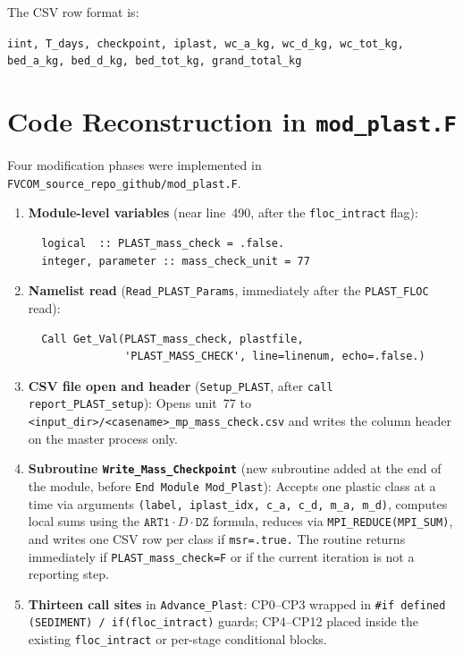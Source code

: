 \documentclass[11pt]{article}
\begin{document}
The CSV row format is:
\begin{center}
\texttt{iint, T\_days, checkpoint, iplast, wc\_a\_kg, wc\_d\_kg, wc\_tot\_kg, bed\_a\_kg, bed\_d\_kg, bed\_tot\_kg, grand\_total\_kg}
\end{center}

\section*{Code Reconstruction in \texttt{mod\_plast.F}}

Four modification phases were implemented in
\texttt{FVCOM\_source\_repo\_github/mod\_plast.F}.

\begin{enumerate}

\item \textbf{Module-level variables} (near line~490, after the \texttt{floc\_intract}
flag):
\begin{verbatim}
  logical  :: PLAST_mass_check = .false.
  integer, parameter :: mass_check_unit = 77
\end{verbatim}

\item \textbf{Namelist read} (\texttt{Read\_PLAST\_Params}, immediately after the
\texttt{PLAST\_FLOC} read):
\begin{verbatim}
  Call Get_Val(PLAST_mass_check, plastfile,
               'PLAST_MASS_CHECK', line=linenum, echo=.false.)
\end{verbatim}

\item \textbf{CSV file open and header} (\texttt{Setup\_PLAST}, after
\texttt{call report\_PLAST\_setup}):
Opens unit~77 to \texttt{<input\_dir>/<casename>\_mp\_mass\_check.csv} and
writes the column header on the master process only.

\item \textbf{Subroutine \texttt{Write\_Mass\_Checkpoint}} (new subroutine added at
the end of the module, before \texttt{End Module Mod\_Plast}):
Accepts one plastic class at a time via arguments
\texttt{(label, iplast\_idx, c\_a, c\_d, m\_a, m\_d)}, computes local sums using
the $\texttt{ART1}\cdot D\cdot\texttt{DZ}$ formula, reduces via
\texttt{MPI\_REDUCE(MPI\_SUM)}, and writes one CSV row per class if
\texttt{msr=.true.}  The routine returns immediately if
\texttt{PLAST\_mass\_check=F} or if the current iteration is not a reporting
step.

\item \textbf{Thirteen call sites} in \texttt{Advance\_Plast}: CP0--CP3 wrapped in
\texttt{\#if defined (SEDIMENT) / if(floc\_intract)} guards; CP4--CP12 placed
inside the existing \texttt{floc\_intract} or per-stage conditional blocks.

\end{enumerate}
\end{document}
